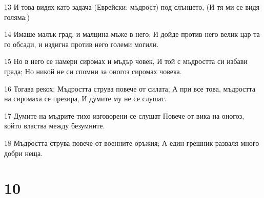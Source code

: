 \par 13 И това видях като задача (Еврейски: мъдрост) под слънцето, (И тя ми се видя голяма:)
\par 14 Имаше малък град, и малцина мъже в него; И дойде против него велик цар та го обсади, и издигна против него големи могили.
\par 15 Но в него се намери сиромах и мъдър човек, И той с мъдростта си избави града; Но никой не си спомни за оногоз сиромах човека.
\par 16 Тогава рекох: Мъдростта струва повече от силата; А при все това, мъдростта на сиромаха се презира, И думите му не се слушат.
\par 17 Думите на мъдрите тихо изговорени се слушат Повече  от вика на оногоз, който властва между безумните.
\par 18 Мъдростта струва повече от военните оръжия; А един грешник разваля много добри неща.

\chapter{10}


